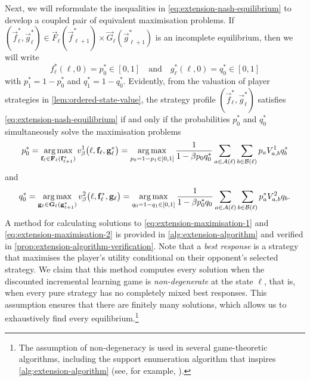     Next, we will reformulate the inequalities in \eqref{eq:extension-nash-equilibrium} to develop a coupled pair of equivalent maximisation problems.
    If $(\vec{f}^*_\ell, \vec{g}^*_\ell) \in \vec{F}_\ell(\vec{f}^*_{\ell + 1}) \times \vec{G}_\ell(\vec{g}^*_{\ell + 1})$ is an incomplete equilibrium, then we will write
    \[
        f^*_\ell(\ell, 0) 
            = p^*_0 
            \in [0, 1]
        \quad\text{and}\quad
        g^*_\ell(\ell, 0)
            = q^*_0
            \in [0, 1]
    \]
    with $p^*_1 = 1 - p^*_0$ and $q^*_1 = 1 - q^*_0$.
    Evidently, from the valuation of player strategies in \autoref{lem:ordered-state-value}, the strategy profile $(\vec{f}^*_\ell, \vec{g}^*_\ell)$ satisfies \eqref{eq:extension-nash-equilibrium} if and only if the probabilities $p^*_0$ and $q^*_0$ simultaneously solve the maximisation problems
    \begin{equation}  \label{eq:extension-maximisation-1}
        p^*_0
            = \operatorname*{arg\,max}_{\mathbf{f}_\ell \in \mathbf{F}_\ell(\mathbf{f}^*_{\ell + 1})} v^1_\beta\big(\ell, \mathbf{f}_\ell, \mathbf{g}^*_\ell\big)
            = \operatorname*{arg\,max}_{p_0 = 1 - p_1 \in [0, 1]} \frac{1}{1 - \beta p_0 q^*_0} \sum_{a \in \mathcal{A}(\ell)} \sum_{b \in \mathcal{B}(\ell)} p_a V^1_{a, b} q^*_b
    \end{equation}
    and
    \begin{equation}  \label{eq:extension-maximisation-2}
        q^*_0
            = \operatorname*{arg\,max}_{\mathbf{g}_\ell \in \mathbf{G}_\ell(\mathbf{g}^*_{\ell + 1})} v^2_\beta\big(\ell, \mathbf{f}^*_\ell, \mathbf{g}_\ell\big)
            = \operatorname*{arg\,max}_{q_0 = 1 - q_1 \in [0, 1]} \frac{1}{1 - \beta p^*_0 q_0} \sum_{a \in \mathcal{A}(\ell)} \sum_{b \in \mathcal{B}(\ell)} p^*_a V^2_{a, b} q_b.
    \end{equation}
    A method for calculating solutions to \eqref{eq:extension-maximisation-1} and \eqref{eq:extension-maximisation-2} is provided in \autoref{alg:extension-algorithm} and verified in \autoref{prop:extension-algorithm-verification}.
    Note that a \emph{best response} is a strategy that maximises the player's utility conditional on their opponent's selected strategy.
    We claim that this method computes every solution when the discounted incremental learning game is \emph{non-degenerate} at the state $\ell$, that is, when every pure strategy has no completely mixed best responses.
    This assumption ensures that there are finitely many solutions, which allows us to exhaustively find every equilibrium.\footnote{The
        assumption of non-degeneracy is used in several game-theoretic algorithms, including the support enumeration algorithm that inspires \autoref{alg:extension-algorithm} (see, for example, \parencite[Algorithm 3.4]{vonStengel2007}).
    }

